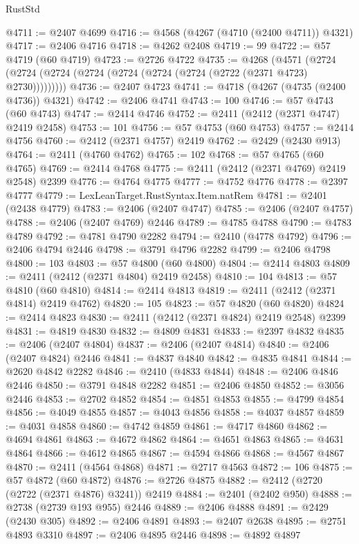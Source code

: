 \begin{lexlean}{RustStd}
\begin{coremodule}
@4711 := @2407 @4699
@4716 := @4568 (@4267 (@4710 (@2400 @4711)) @4321)
@4717 := @2406 @4716
@4718 := @4262 @2408
@4719 := 99
@4722 := @57 @4719 (@60 @4719)
@4723 := @2726 @4722
@4735 := @4268
    (@4571 (@2724 (@2724 (@2724 (@2724 (@2724 (@2724 (@2724 (@2722 (@2371 @4723) @2730)))))))))
@4736 := @2407 @4723
@4741 := @4718 (@4267 (@4735 (@2400 @4736)) @4321)
@4742 := @2406 @4741
@4743 := 100
@4746 := @57 @4743 (@60 @4743)
@4747 := @2414 @4746
@4752 := @2411 (@2412 (@2371 @4747) @2419 @2458)
@4753 := 101
@4756 := @57 @4753 (@60 @4753)
@4757 := @2414 @4756
@4760 := @2412 (@2371 @4757) @2419
@4762 := @2429 (@2430 @913)
@4764 := @2411 (@4760 @4762)
@4765 := 102
@4768 := @57 @4765 (@60 @4765)
@4769 := @2414 @4768
@4775 := @2411 (@2412 (@2371 @4769) @2419 @2548) @2399
@4776 := @4764 @4775
@4777 := @4752 @4776
@4778 := @2397 @4777
@4779 := LexLeanTarget.RustSyntax.Item.natRem
@4781 := @2401 (@2438 @4779)
@4783 := @2406 (@2407 @4747)
@4785 := @2406 (@2407 @4757)
@4788 := @2406 (@2407 @4769) @2446
@4789 := @4785 @4788
@4790 := @4783 @4789
@4792 := @4781 @4790 @2282
@4794 := @2410 (@4778 @4792)
@4796 := @2406 @4794 @2446
@4798 := @3791 @4796 @2282
@4799 := @2406 @4798
@4800 := 103
@4803 := @57 @4800 (@60 @4800)
@4804 := @2414 @4803
@4809 := @2411 (@2412 (@2371 @4804) @2419 @2458)
@4810 := 104
@4813 := @57 @4810 (@60 @4810)
@4814 := @2414 @4813
@4819 := @2411 (@2412 (@2371 @4814) @2419 @4762)
@4820 := 105
@4823 := @57 @4820 (@60 @4820)
@4824 := @2414 @4823
@4830 := @2411 (@2412 (@2371 @4824) @2419 @2548) @2399
@4831 := @4819 @4830
@4832 := @4809 @4831
@4833 := @2397 @4832
@4835 := @2406 (@2407 @4804)
@4837 := @2406 (@2407 @4814)
@4840 := @2406 (@2407 @4824) @2446
@4841 := @4837 @4840
@4842 := @4835 @4841
@4844 := @2620 @4842 @2282
@4846 := @2410 (@4833 @4844)
@4848 := @2406 @4846 @2446
@4850 := @3791 @4848 @2282
@4851 := @2406 @4850
@4852 := @3056 @2446
@4853 := @2702 @4852
@4854 := @4851 @4853
@4855 := @4799 @4854
@4856 := @4049 @4855
@4857 := @4043 @4856
@4858 := @4037 @4857
@4859 := @4031 @4858
@4860 := @4742 @4859
@4861 := @4717 @4860
@4862 := @4694 @4861
@4863 := @4672 @4862
@4864 := @4651 @4863
@4865 := @4631 @4864
@4866 := @4612 @4865
@4867 := @4594 @4866
@4868 := @4567 @4867
@4870 := @2411 (@4564 @4868)
@4871 := @2717 @4563
@4872 := 106
@4875 := @57 @4872 (@60 @4872)
@4876 := @2726 @4875
@4882 := @2412 (@2720 (@2722 (@2371 @4876) @3241)) @2419
@4884 := @2401 (@2402 @950)
@4888 := @2738 (@2739 @193 @955) @2446
@4889 := @2406 @4888
@4891 := @2429 (@2430 @305)
@4892 := @2406 @4891
@4893 := @2407 @2638
@4895 := @2751 @4893 @3310
@4897 := @2406 @4895 @2446
@4898 := @4892 @4897

\end{coremodule}
\end{lexlean}
